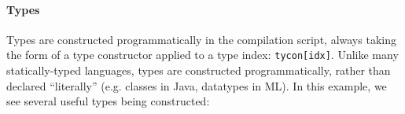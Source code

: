 \documentclass[9pt]{sigplanconf}
\newcommand{\lstinlinep}[1]{\lstinline[language=Python,basicstyle=\ttfamily\small,deletendkeywords={tuple,buffer,map}]{#1}}
\begin{document}
\paragraph{Types}
Types are constructed programmatically in the compilation script, always taking the form of a type constructor applied to a type index:  \lstinlinep{tycon[idx]}. Unlike many statically-typed languages, types are constructed programmatically, rather than  declared ``literally'' (e.g. classes in Java, datatypes in ML). %
In this example, we see several useful types being constructed:
\end{document}
